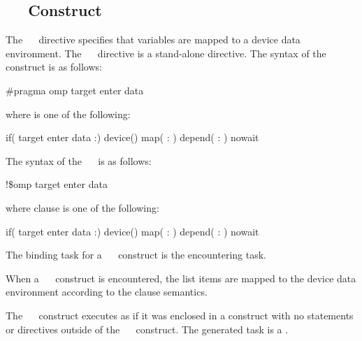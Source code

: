 \subsection{~~ Construct}
\label{subsec:target enter data Construct}
\summary
The ~~ directive specifies that variables are mapped to a device data environment. The ~~ directive is a stand-alone directive.
\syntax
\ccppspecificstart
The syntax of the ~~ construct is as follows:
\begin{boxedcode}
\#pragma omp target enter data 
\end{boxedcode}
where  is one of the following:
\begin{indentedcodelist}
if(\plc{[} target enter data :\plc{] scalar-expression})
device()
map(\plc{[ [map-type-modifier[,]] map-type} : \plc{] list})
depend( : )
nowait
\end{indentedcodelist}
\ccppspecificend
\fortranspecificstart
The syntax of the ~~ is as follows:
\begin{boxedcode}
!\$omp target enter data 
\end{boxedcode}
where clause is one of the following:
\begin{indentedcodelist}
if(\plc{[} target enter data :\plc{] scalar-logical-expression})
device()
map(\plc{[ [map-type-modifier[,]] map-type} : \plc{] list})
depend( : )
nowait
\end{indentedcodelist}
\fortranspecificend

\binding
The binding task for a ~~ construct is the encountering task. 

\descr
When a ~~ construct is encountered, the list items are mapped to the device data environment according to the  clause semantics.

The ~~ construct executes as if it was enclosed in a  construct with no statements or directives outside of the ~~ construct. The generated task is a .


